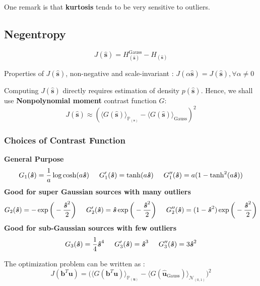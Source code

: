 One remark is that  \textbf{kurtosis} tends to be very sensitive to outliers.

\subsection{Negentropy}
$$
J(\boldsymbol{\hat{s}}) = H_{(\boldsymbol{\hat{s}})}^{\text{Gauss}} - H_{(\boldsymbol{\hat{s}})}
$$

Properties of $J(\boldsymbol{\hat{s}})$, non-negative and scale-invariant : $J(\alpha \boldsymbol{\hat{s}}) = J(\boldsymbol{\hat{s}}) , \forall \alpha \ne 0$

Computing $J(\boldsymbol{\hat{s}})$ directly requires estimation of density $p(\boldsymbol{\hat{s}})$.  Hence, we shall use \textbf{Nonpolynomial moment} contrast function $G$:
$$
J(\boldsymbol{\hat{s}}) \approx (  \langle G(\boldsymbol{\hat{s}}) \rangle_{\mathbb{P}_(\boldsymbol{s})} - \langle G(\boldsymbol{\hat{s}}) \rangle_{\text{Gauss}} ) ^2
$$

\subsubsection{Choices of Contrast Function}
\textbf{General Purpose}
$$ 
G_1(\boldsymbol{\hat{s}}) = \frac{1}{a} \log \cosh(a\boldsymbol{\hat{s}}) \hspace{0.5cm} G_1'(\boldsymbol{\hat{s}}) = \tanh(a\boldsymbol{\hat{s}}) \hspace{0.5cm} G_1''(\boldsymbol{\hat{s}}) = a(1-\tanh^2(a\boldsymbol{\hat{s}}))
$$
\textbf{Good for super Gaussian sources with many outliers}
$$ 
G_2(\boldsymbol{\hat{s}}) = -\exp \bigg ( - \frac{\boldsymbol{\hat{s}}^2}{2} \bigg ) \hspace{0.5cm} G_2'(\boldsymbol{\hat{s}}) = \boldsymbol{\hat{s}} \exp \bigg ( - \frac{\boldsymbol{\hat{s}}^2}{2} \bigg ) \hspace{0.5cm} G_2''(\boldsymbol{\hat{s}}) = (1-\boldsymbol{\hat{s}}^2) \exp \bigg ( - \frac{\boldsymbol{\hat{s}}^2}{2} \bigg ) 
$$
\textbf{Good for sub-Gaussian sources with few outliers}
$$ 
G_3(\boldsymbol{\hat{s}}) =  \frac{1}{4} \boldsymbol{\hat{s}}^4 \hspace{0.5cm} G_3'(\boldsymbol{\hat{s}}) = \boldsymbol{\hat{s}}^3 \hspace{0.5cm} G_3''(\boldsymbol{\hat{s}}) = 3\boldsymbol{\hat{s}}^2
$$

The optimization problem can be written as :
$$
J(\boldsymbol{b}^T\boldsymbol{u}) = \bigg(  \langle G(\boldsymbol{b}^T\boldsymbol{u}) \rangle_{\mathbb{P}_(\boldsymbol{u})} - \langle G(\boldsymbol{\hat{u}}_{\text{Gauss}}) \rangle_{\mathcal{N}_{(0,1)}} \bigg) ^2
$$
